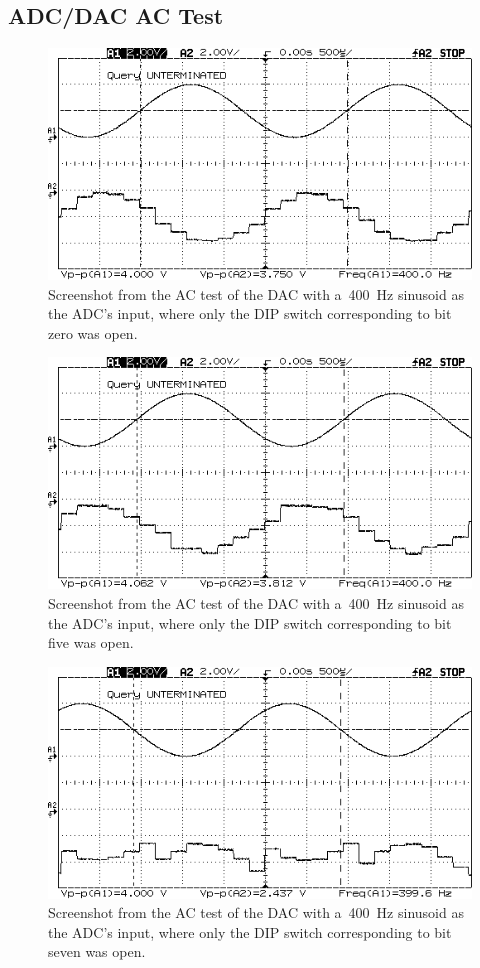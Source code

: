 \subsection{ADC/DAC AC Test}
\begin{figure}[H]
	\centering
	\includegraphics[width=.6\textwidth]{img/shot/pt4b_bit0.png}
	\parbox{.6\textwidth}{
	\caption[\SI{400}{\hertz} Sine Wave --- Bit 0 Open]{Screenshot from the AC test of the DAC with a~\SI{400}{\hertz} sinusoid as the ADC's input, where only the DIP switch corresponding to bit zero was open.}
	\label{fig:pt4b_bit0}}
\end{figure}

\begin{figure}[H]
	\centering
	\includegraphics[width=.6\textwidth]{img/shot/pt4b_bit5.png}
	\parbox{.6\textwidth}{
	\caption[\SI{400}{\hertz} Sine Wave --- Bit 5 Open]{Screenshot from the AC test of the DAC with a~\SI{400}{\hertz} sinusoid as the ADC's input, where only the DIP switch corresponding to bit five was open.}
	\label{fig:pt4b_bit5}}
\end{figure}

\begin{figure}[H]
	\centering
	\includegraphics[width=.6\textwidth]{img/shot/pt4b_bit7.png}
	\parbox{.6\textwidth}{
	\caption[\SI{400}{\hertz} Sine Wave --- Bit 7 Open]{Screenshot from the AC test of the DAC with a~\SI{400}{\hertz} sinusoid as the ADC's input, where only the DIP switch corresponding to bit seven was open.}
	\label{fig:pt4b_bit7}}
\end{figure}

